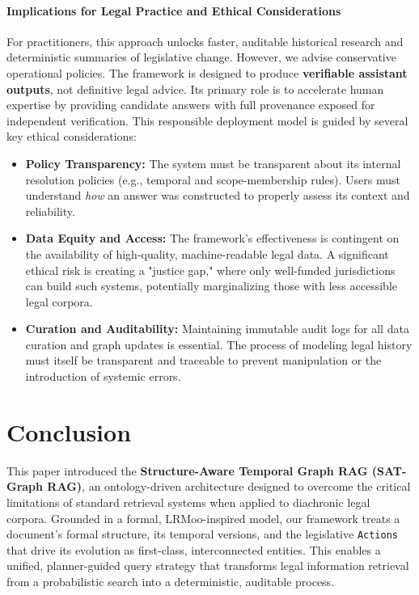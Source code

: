 \documentclass[11pt]{article}
\begin{document}
\paragraph{Implications for Legal Practice and Ethical Considerations}
For practitioners, this approach unlocks faster, auditable historical research and deterministic summaries of legislative change. However, we advise conservative operational policies. The framework is designed to produce \textbf{verifiable assistant outputs}, not definitive legal advice. Its primary role is to accelerate human expertise by providing candidate answers with full provenance exposed for independent verification. This responsible deployment model is guided by several key ethical considerations:

\begin{itemize}[noitemsep, topsep=0pt, leftmargin=*]
    \item \textbf{Policy Transparency:} The system must be transparent about its internal resolution policies (e.g., temporal and scope-membership rules). Users must understand \textit{how} an answer was constructed to properly assess its context and reliability.
    
    \item \textbf{Data Equity and Access:} The framework's effectiveness is contingent on the availability of high-quality, machine-readable legal data. A significant ethical risk is creating a "justice gap," where only well-funded jurisdictions can build such systems, potentially marginalizing those with less accessible legal corpora.
    
    \item \textbf{Curation and Auditability:} Maintaining immutable audit logs for all data curation and graph updates is essential. The process of modeling legal history must itself be transparent and traceable to prevent manipulation or the introduction of systemic errors.
\end{itemize}

\section{Conclusion}
\label{sec:conclusion}

This paper introduced the \textbf{Structure-Aware Temporal Graph RAG (SAT-Graph RAG)}, an ontology-driven architecture designed to overcome the critical limitations of standard retrieval systems when applied to diachronic legal corpora. Grounded in a formal, LRMoo-inspired model, our framework treats a document's formal structure, its temporal versions, and the legislative \texttt{Actions} that drive its evolution as first-class, interconnected entities. This enables a unified, planner-guided query strategy that transforms legal information retrieval from a probabilistic search into a deterministic, auditable process.
\end{document}
